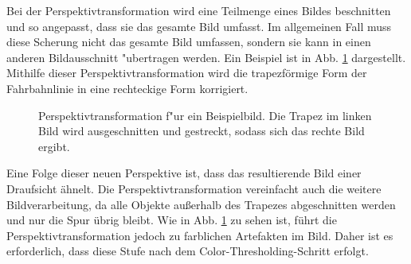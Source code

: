 \documentclass[arbeit=studie,oneside,BCOR=12mm]{ArbeitRST}
\begin{document}
Bei der Perspektivtransformation wird eine Teilmenge eines Bildes beschnitten
und so angepasst, dass sie das gesamte Bild umfasst. Im allgemeinen Fall muss
diese Scherung nicht das gesamte Bild umfassen, sondern sie kann in einen
anderen Bildausschnitt "ubertragen werden. Ein Beispiel ist in Abb.
\ref{roi-pt} dargestellt. Mithilfe dieser Perspektivtransformation wird die
trapezförmige Form der Fahrbahnlinie in eine rechteckige Form korrigiert. \\

\begin{figure}[h]
    \centering
    \caption{Perspektivtransformation f"ur ein Beispielbild. Die Trapez im linken
    Bild wird ausgeschnitten und gestreckt, sodass sich das rechte Bild ergibt.}
    \label{roi-pt}
\end{figure}

Eine Folge dieser neuen Perspektive ist, dass das resultierende Bild einer
Draufsicht ähnelt. Die Perspektivtransformation vereinfacht auch die
weitere Bildverarbeitung, da alle Objekte außerhalb des Trapezes abgeschnitten
werden und nur die Spur übrig bleibt. Wie in Abb. \ref{roi-pt} zu sehen ist, führt die
Perspektivtransformation jedoch zu farblichen Artefakten im Bild. Daher ist es erforderlich, dass diese Stufe nach dem
\glqq Color-Thresholding\grqq-Schritt erfolgt.
\end{document}
